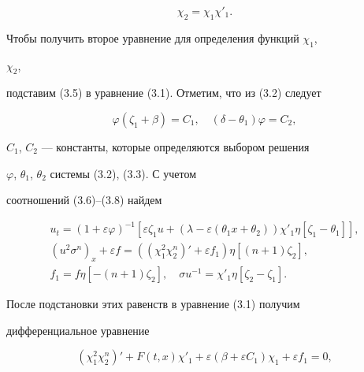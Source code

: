 \begin{equation} 


\chi_2=\chi_1\chi'_1. 


\tag{3.7} 


\end{equation} 


Чтобы получить второе уравнение для определения функций $\chi_1$, 


$\chi_2$, 


подставим (3.5) в уравнение (3.1). Отметим, что из (3.2) следует 


\begin{equation} 


\varphi(\zeta_1+\beta)=C_1,\quad (\delta-\theta_1)\varphi=C_2, 


\tag{3.8} 


\end{equation} 


$C_1$, $C_2$ --- константы, которые определяются выбором решения 


$\varphi$, $\theta_1$, $\theta_2$ системы (3.2), (3.3). С учетом 


соотношений (3.6)--(3.8) найдем 


\begin{gather*} 


u_t=(1+\varepsilon\varphi)^{-1}[\varepsilon\zeta_1u+ 


(\lambda-\varepsilon(\theta_1x+\theta_2)) 


\chi'_1\eta[\zeta_1-\theta_1]],\\ 


(u^2\sigma^n)_x+\varepsilon f=((\chi^2_1\chi^n_2)'+\varepsilon f_1) 


\eta[(n+1)\zeta_2],\\ 


f_1=f\eta[-(n+1)\zeta_2],\quad \sigma u^{-1}= 


\chi'_1\eta[\zeta_2-\zeta_1]. 


\end{gather*} 


После подстановки этих равенств в уравнение (3.1) получим 


дифференциальное уравнение 


\begin{equation} 


(\chi^2_1\chi^n_2)'+F(t,x)\chi'_1+\varepsilon 


(\beta+\varepsilon C_1)\chi_1+\varepsilon f_1=0, \tag{3.9} 


\end{equation} 


